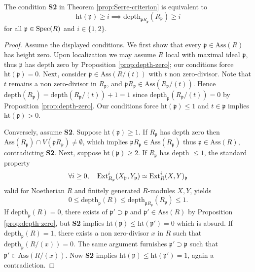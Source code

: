 \begin{proposition}\label{prop:S2}
	The condition \textbf{S2} in Theorem \ref{prop:Serre-criterion} is equivalent to
	\[ \mathrm{ht}(\mathfrak{p}) \geq i \implies \mathrm{depth}_{\mathfrak{p}R_{\mathfrak{p}}}(R_{\mathfrak{p}}) \geq i \]
	for all $\mathfrak{p} \in \operatorname{Spec}(R)$ and $i \in \{1,2\}$.
\end{proposition}
\begin{proof}
	Assume the displayed conditions. We first show that every $\mathfrak{p} \in \text{Ass}(R)$ has height zero. Upon localization we may assume $R$ local with maximal ideal $\mathfrak{p}$, thus $\mathfrak{p}$ has depth zero by Proposition \ref{prop:depth-zero}; our conditions force $\text{ht}(\mathfrak{p})=0$. Next, consider $\mathfrak{p} \in \text{Ass}(R/(t))$ with $t$ non zero-divisor. Note that $t$ remains a non zero-divisor in $R_{\mathfrak{p}}$, and $\mathfrak{p}R_{\mathfrak{p}} \in \text{Ass}(R_{\mathfrak{p}}/(t))$. Hence $\text{depth}(R_{\mathfrak{p}}) = \text{depth}(R_{\mathfrak{p}}/(t)) + 1 = 1$ since $\text{depth}_{\mathfrak{p}}(R_{\mathfrak{p}}/(t)) = 0$ by Proposition \ref{prop:depth-zero}. Our conditions force $\text{ht}(\mathfrak{p}) \leq 1$ and $t \in \mathfrak{p}$ implies $\text{ht}(\mathfrak{p}) > 0$.
	
	Conversely, assume \textbf{S2}. Suppose $\text{ht}(\mathfrak{p}) \geq 1$. If $R_{\mathfrak{p}}$ has depth zero then $\text{Ass}(R_{\mathfrak{p}}) \cap V(\mathfrak{p}R_{\mathfrak{p}}) \neq \emptyset$, which implies $\mathfrak{p}R_{\mathfrak{p}} \in \text{Ass}(R_{\mathfrak{p}})$ thus $\mathfrak{p} \in \text{Ass}(R)$, contradicting \textbf{S2}. Next, suppose $\text{ht}(\mathfrak{p}) \geq 2$. If $R_{\mathfrak{p}}$ has depth $\leq 1$, the standard property
	\[ \forall i \geq 0, \quad \operatorname{Ext}^i_{R_{\mathfrak{p}}}(X_{\mathfrak{p}}, Y_{\mathfrak{p}}) \simeq \operatorname{Ext}^i_R(X,Y)_{\mathfrak{p}} \]
	valid for Noetherian $R$ and finitely generated $R$-modules $X, Y$, yields
	\[ 0 \leq \text{depth}_{\mathfrak{p}}(R) \leq \text{depth}_{\mathfrak{p}R_{\mathfrak{p}}}(R_{\mathfrak{p}}) \leq 1. \]
	If $\text{depth}_{\mathfrak{p}}(R)=0$, there exists of $\mathfrak{p}' \supset \mathfrak{p}$ and $\mathfrak{p}' \in \text{Ass}(R)$ by Proposition \ref{prop:depth-zero}, but \textbf{S2} implies $\text{ht}(\mathfrak{p}) \leq \text{ht}(\mathfrak{p}') = 0$ which is absurd. If $\text{depth}_{\mathfrak{p}}(R)=1$, there exists a non zero-divisor $x$ in $R$ such that $\text{depth}_{\mathfrak{p}}(R/(x)) = 0$. The same argument furnishes $\mathfrak{p}' \supset \mathfrak{p}$ such that $\mathfrak{p}' \in \text{Ass}(R/(x))$. Now \textbf{S2} implies $\text{ht}(\mathfrak{p}) \leq \text{ht}(\mathfrak{p}')=1$, again a contradiction.
\end{proof}

